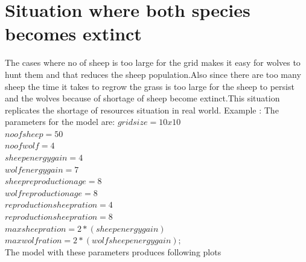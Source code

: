 \documentclass[prl,12pt,citeautoscript,reprint]{revtex4-1}
\begin{document}
\section{Situation where both species becomes extinct}
The cases where no of sheep is too large for the grid makes it easy for wolves to hunt them and that reduces the sheep population.Also since there are too many sheep the time it takes to regrow the grass is too large for the sheep to persist and the wolves because of shortage of sheep become extinct.This situation replicates the shortage of resources situation in real world.\newline
Example : \newline
The parameters for the model are:\newline
$ grid size = 10x10 $\\
$no of sheep=50$\\
$no of wolf=4$\\
$sheep energy gain = 4$\\
$wolf energy gain = 7$\\
$sheep reproduction age=8$\\
$wolf reproduction age=8$\\
$reproduction sheep ration=4$\\
$reproduction sheep ration=8$\\
$max sheep ration=2*(sheep energy gain)$\\
$max wolf ration=2*(wolf sheep energy gain);$\\
The model with these parameters produces following plots
\end{document}
